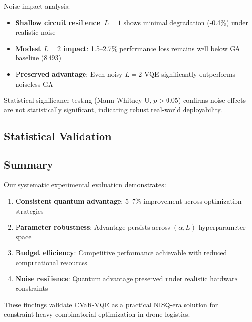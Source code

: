 Noise impact analysis:
\begin{itemize}[nosep]
    \item \textbf{Shallow circuit resilience}: $L=1$ shows minimal degradation (-0.4\%) under realistic noise
    \item \textbf{Modest $L=2$ impact}: 1.5--2.7\% performance loss remains well below GA baseline ($8\,493$)
    \item \textbf{Preserved advantage}: Even noisy $L=2$ VQE significantly outperforms noiseless GA
\end{itemize}

Statistical significance testing (Mann-Whitney U, $p > 0.05$) confirms noise effects are not statistically significant, indicating robust real-world deployability.

\subsection{Statistical Validation}


\subsection{Summary}

Our systematic experimental evaluation demonstrates:
\begin{enumerate}[nosep]
    \item \textbf{Consistent quantum advantage}: 5--7\% improvement across optimization strategies
    \item \textbf{Parameter robustness}: Advantage persists across $(\alpha, L)$ hyperparameter space  
    \item \textbf{Budget efficiency}: Competitive performance achievable with reduced computational resources
    \item \textbf{Noise resilience}: Quantum advantage preserved under realistic hardware constraints
\end{enumerate}

These findings validate CVaR-VQE as a practical NISQ-era solution for constraint-heavy combinatorial optimization in drone logistics.

